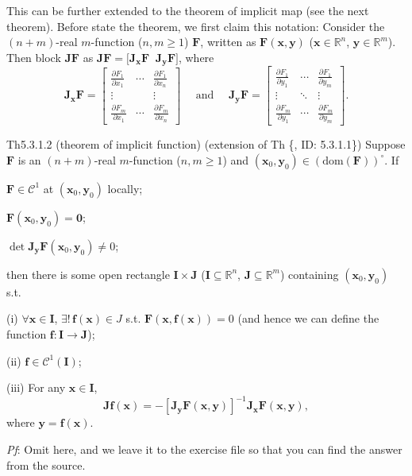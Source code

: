 \documentclass{article}
\newcommand{\parfrac}[2]{\frac{\partial #1}{\partial #2}}
\begin{document}
\begin{Rmk}{}
    This can be further extended to the theorem of implicit map (see the next theorem). Before state the theorem, we first claim this notation: \textcolor{Df}{Consider the $(n+m)$-real $m$-function ($n,m\geq 1$) $\pmb{F}$, written as $\pmb{F}(\pmb{x}, \pmb{y})$ ($\pmb{x}\in\mathbb{R}^n$, $\pmb{y}\in\mathbb{R}^m$). Then block $\pmb{JF}$ as $\pmb{J F} = \big[\pmb{J_x F}\;\; \pmb{J_y F}\big]$, where
    $$ 
    \pmb{J_x F} = \begin{bmatrix}
        \parfrac{F_1}{x_1} & \cdots & \parfrac{F_1}{x_n} \\
        \vdots & & \vdots \\
        \parfrac{F_m}{x_1} & \cdots & \parfrac{F_m}{x_n}
    \end{bmatrix}
    \quad\text{ and }\quad
    \pmb{J_y F} = \begin{bmatrix}
        \parfrac{F_1}{y_1} & \cdots & \parfrac{F_1}{y_m} \\
        \vdots & \ddots & \vdots \\
        \parfrac{F_m}{y_1} & \cdots & \parfrac{F_m}{y_m}
    \end{bmatrix}.
    $$
    }
\end{Rmk}

\begin{Th}{Th5.3.1.2 (theorem of implicit function) (extension of Th \{, ID: 5.3.1.1\})}
    Suppose $\pmb{F}$ is an $(n+m)$-real $m$-function ($n,m\geq 1$) and $(\pmb{x}_0, \pmb{y}_0)\in (\text{dom}(\pmb{F}))^\circ$. If
    \begin{compactenum}
        \item $\pmb{F}\in\mathcal{C}^1$ at $(\pmb{x}_0, \pmb{y}_0)$ locally;
        \item $\pmb{F}(\pmb{x}_0, \pmb{y}_0) = \pmb{0}$;
        \item $\det \pmb{J}_{\pmb{y}} \pmb{F}(\pmb{x}_0, \pmb{y}_0)\neq 0$;
    \end{compactenum}
    then there is some open rectangle $\pmb{I}\times\pmb{J}$ ($\pmb{I}\subseteq\mathbb{R}^n$, $\pmb{J}\subseteq\mathbb{R}^m$) containing $(\pmb{x}_0, \pmb{y}_0)$ s.t.
    \begin{compactenum}
        \item[(i)] $\forall \pmb{x}\in \pmb{I}$, $\exists!\, \pmb{f}(\pmb{x})\in J$ s.t. $\pmb{F}(\pmb{x}, \pmb{f}(\pmb{x})) = 0$ (and hence we can define the function $\pmb{f}: \pmb{I}\rightarrow \pmb{J}$);
        \item[(ii)] $\pmb{f}\in\mathcal{C}^1(\pmb{I})$;
        \item[(iii)] For any $\pmb{x}\in\pmb{I}$,
        $$ \pmb{Jf}(\pmb{x}) = -[\pmb{J}_{\pmb{y}} \pmb{F}(\pmb{x}, \pmb{y})]^{-1} \pmb{J}_{\pmb{x}} \pmb{F}(\pmb{x}, \pmb{y}), $$
        where $\pmb{y} = \pmb{f}(\pmb{x})$.
    \end{compactenum}
    \tcblower
    \textit{Pf}: Omit here, and we leave it to the exercise file so that you can find the answer from the source.
\end{Th}
\end{document}
